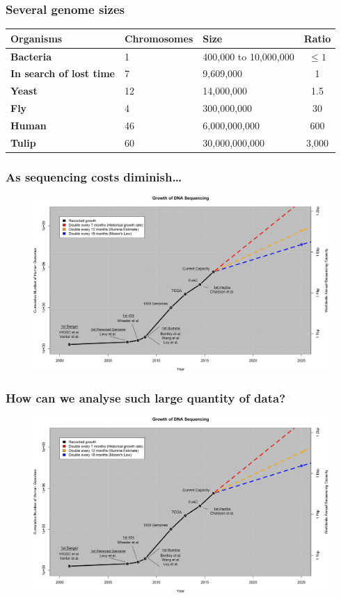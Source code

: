 \documentclass[xcolor=dvipsnames]{beamer}
\begin{document}
\begin{frame}
\frametitle{Several genome sizes}

\begin{table}
\footnotesize
\begin{tabular}{l | l | l | c}
{\bf Organisms} &{\bf Chromosomes} & {\bf Size} & {\bf Ratio} \\
\hline
{\bf Bacteria} & 1 & 400,000 to 10,000,000 & $\leq 1$ \\
{\color{Blue} \bf In search of lost time} & 7 & 9,609,000 & 1\\
{\bf Yeast} & 12 & 14,000,000 & 1.5 \\
{\bf Fly} & 4 & 300,000,000 & 30 \\
{\bf Human} & 46 & 6,000,000,000 & 600 \\
{\bf Tulip} & 60 & 30,000,000,000 & 3,000 \\
\end{tabular}
\end{table}
\end{frame}

\begin{frame}
\frametitle{As sequencing costs diminish\dots}
\begin{figure}
\includegraphics[width=0.9\linewidth]{images/dna_sequences_growth.PNG}
\end{figure}
\end{frame}


\begin{frame}
\frametitle{How can we analyse such large quantity of data?}
\begin{figure}
\includegraphics[width=0.9\linewidth]{images/dna_sequences_growth.PNG}
\end{figure}
\end{frame}
\end{document}
